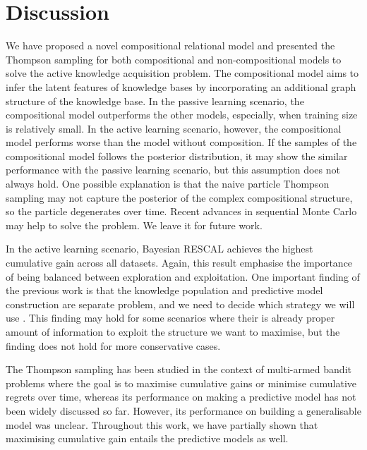 \section{Discussion}
We have proposed a novel compositional relational model and presented the
Thompson sampling for both compositional and non-compositional models to solve the active knowledge acquisition 
problem. The compositional model aims to infer the latent features of knowledge 
bases by incorporating an additional graph structure of the knowledge base. In the passive 
learning scenario, the compositional model outperforms the other models, 
especially, when training size is relatively small. In the active learning 
scenario, however, the compositional model performs worse than the model without 
composition. If the samples of the compositional model follows the posterior 
distribution, it may show the similar performance with the passive learning 
scenario, but this assumption does not always hold. One possible explanation is 
that the naive particle Thompson sampling may not capture the posterior of the 
complex compositional structure, so the particle degenerates over time. Recent
 advances in sequential Monte Carlo may help to solve the problem\cite{gu2015neural,naesseth2014sequential,lindsten2014divide}. 
We leave it  for future work.
 
In the active learning scenario, Bayesian RESCAL achieves the highest 
cumulative gain across all datasets. Again, this result emphasise the 
importance of being balanced between exploration and exploitation. One 
important finding of the previous work is that the knowledge population 
and predictive model construction are separate problem, and we need to 
decide which strategy we will use \cite{kajino2015active}. This finding
may hold for some scenarios where their is already proper amount of 
information to exploit the structure we want to maximise, but the finding 
does not hold for more conservative cases.

The Thompson sampling has been studied in the context of multi-armed bandit 
problems where the goal is to maximise cumulative gains or minimise cumulative 
regrets over time, whereas its performance on making a predictive model has not 
been widely discussed so far. However, its performance on building a generalisable model was unclear. Throughout this work, we have partially shown that maximising cumulative gain entails the predictive models as well.

